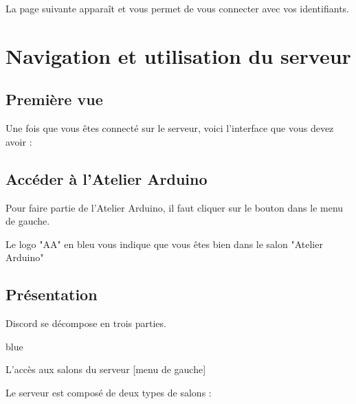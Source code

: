 {


La page suivante apparaît et vous permet de vous connecter avec vos identifiants.



\newpage


\section{Navigation et utilisation du serveur}

\subsection{Première vue}

Une fois que vous êtes connecté sur le serveur, voici l'interface que vous devez avoir : 



\subsection{Accéder à l'Atelier Arduino}

Pour faire partie de l'Atelier Arduino, il faut cliquer sur le bouton  dans le menu de gauche. \\



Le logo "AA" en bleu vous indique que vous êtes bien dans le salon "Atelier Arduino"


\subsection{Présentation}

Discord se décompose en trois parties. 

\begin{items}{blue}{\Triangle}
	\item L'accès aux salons du serveur [menu de gauche]


	Le serveur est composé de deux types de salons : 


\end{items}}
